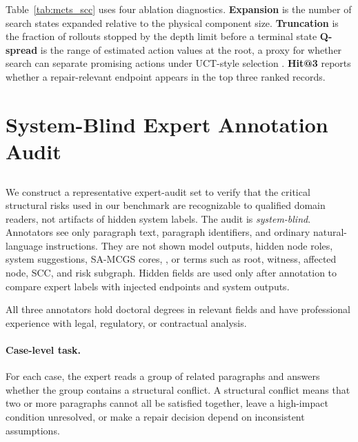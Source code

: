 \documentclass[11pt]{article}
\newcommand{\samcgs}{SA-MCGS}
\newcommand{\naive}{Naive}
\newcommand{\scc}{SCC}
\begin{document}
Table~\ref{tab:mcts_scc} uses four ablation diagnostics.  \textbf{Expansion}
is the number of search states expanded relative to the physical
component size.  \textbf{Truncation} is the fraction of rollouts stopped
by the depth limit before a terminal state  \textbf{Q-spread} is the range of estimated
action values at the root, a proxy for whether search can separate
promising actions under UCT-style selection \citep{kocsis2006bandit}.
\textbf{Hit@3} reports whether a repair-relevant endpoint appears in the
top three ranked records.

\section{System-Blind Expert Annotation Audit}
\label{sec:appendix_annotation}

\subsection{}

We construct a representative expert-audit set to verify that the critical structural risks used in our benchmark are recognizable to qualified domain readers, not artifacts of hidden system labels.  The audit is \emph{system-blind}.  Annotators see only paragraph text, paragraph identifiers, and ordinary natural-language instructions.  They are not shown model outputs, hidden node roles, system suggestions, \samcgs{} cores, \revnewreplace{\naive{} subgraphs}{baseline subgraphs}, or terms such as root, witness, affected node, \scc{}, and risk subgraph.  Hidden fields are used only after annotation to compare expert labels with injected endpoints and system outputs.

All three annotators hold doctoral degrees in relevant fields and have professional experience with legal, regulatory, or contractual analysis. 

\paragraph{Case-level task.}
For each case, the expert reads a group of related paragraphs and answers whether the group contains a structural conflict.  A structural conflict means that two or more paragraphs cannot all be satisfied together, leave a high-impact condition unresolved, or make a repair decision depend on inconsistent assumptions.
\end{document}
